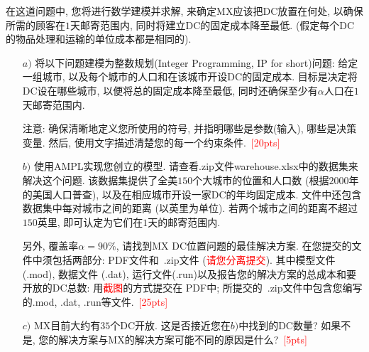 \documentclass[10pt]{article}
\begin{document}
在这道问题中, 您将进行数学建模并求解, 来确定MX应该把DC放置在何处, 以确保所需的顾客在$1$天邮寄范围内, 同时将建立DC的固定成本降至最低. (假定每个DC的物品处理和运输的单位成本都是相同的).
\begin{itemize}
	\item[$a)$] 将以下问题建模为整数规划(Integer Programming, IP for short)问题: 给定一组城市, 以及每个城市的人口和在该城市开设DC的固定成本. 目标是决定将DC设在哪些城市, 以便将总的固定成本降至最低, 同时还确保至少有$\alpha$人口在$1$天邮寄范围内. 
	
	注意: 确保清晰地定义您所使用的符号, 并指明哪些是参数(输入), 哪些是决策变量. 然后, 使用文字描述清楚您的每一个约束条件.~\textcolor{red}{[20pts]}

	\item[$b)$] 使用AMPL实现您创立的模型. 请查看.zip文件warehouse.xlsx中的数据集来解决这个问题. 该数据集提供了全美$150$个大城市的位置和人口数 (根据$2000$年的美国人口普查), 以及在相应城市开设一家DC的年均固定成本. 文件中还包含数据集中每对城市之间的距离 (以英里为单位). 若两个城市之间的距离不超过$150$英里, 即可认定为它们在$1$天的邮寄范围内.
	
	另外, 覆盖率$\alpha = 90\%$, 请找到MX DC位置问题的最佳解决方案. 在您提交的文件中须包括两部分: PDF文件和~.zip文件 (\textcolor{red}{请您分离提交}). 其中模型文件(.mod), 数据文件 (.dat), 运行文件(.run)以及报告您的解决方案的总成本和要开放的DC总数: 用\textcolor{red}{截图}的方式提交在 PDF中; 所提交的~.zip文件中包含您编写的.mod, .dat, .run等文件.~\textcolor{red}{[25pts]}
	
	\item[$c)$] MX目前大约有$35$个DC开放. 这是否接近您在$b)$中找到的DC数量? 如果不是, 您的解决方案与MX的解决方案可能不同的原因是什么?~\textcolor{red}{[5pts]}
\end{itemize}
\end{document}
